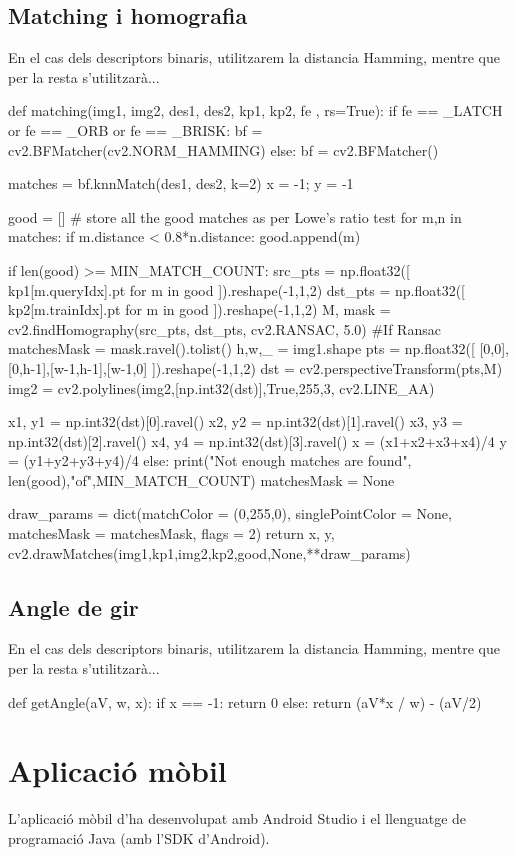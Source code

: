 	\subsection{Matching i homografia}
		En el cas dels descriptors binaris, utilitzarem la distancia Hamming, mentre que per la resta s'utilitzarà...\\
		\begin{python}
def matching(img1, img2, des1, des2, kp1, kp2, fe , rs=True):
	if fe == _LATCH or fe == _ORB or fe == _BRISK:
		bf = cv2.BFMatcher(cv2.NORM_HAMMING)
	else:
		bf = cv2.BFMatcher()

	matches = bf.knnMatch(des1, des2, k=2)
	x = -1; y = -1

	good = [] # store all the good matches as per Lowe's ratio test
	for m,n in matches:
		if m.distance < 0.8*n.distance:
			good.append(m)

	if len(good) >= MIN_MATCH_COUNT:
		src_pts = np.float32([ kp1[m.queryIdx].pt for m in good ]).reshape(-1,1,2)
		dst_pts = np.float32([ kp2[m.trainIdx].pt for m in good ]).reshape(-1,1,2)
		M, mask = cv2.findHomography(src_pts, dst_pts, cv2.RANSAC, 5.0) #If Ransac
		matchesMask = mask.ravel().tolist()
		h,w,_ = img1.shape
		pts = np.float32([ [0,0],[0,h-1],[w-1,h-1],[w-1,0] ]).reshape(-1,1,2)
		dst = cv2.perspectiveTransform(pts,M)
		img2 = cv2.polylines(img2,[np.int32(dst)],True,255,3, cv2.LINE_AA)

		x1, y1 = np.int32(dst)[0].ravel()
		x2, y2 = np.int32(dst)[1].ravel()
		x3, y3 = np.int32(dst)[2].ravel()
		x4, y4 = np.int32(dst)[3].ravel()
		x = (x1+x2+x3+x4)/4
		y = (y1+y2+y3+y4)/4
	else:
		print("Not enough matches are found", len(good),"of",MIN_MATCH_COUNT)
		matchesMask = None

	draw_params = dict(matchColor = (0,255,0), singlePointColor = None,
					matchesMask = matchesMask, flags = 2)
	return x, y, cv2.drawMatches(img1,kp1,img2,kp2,good,None,**draw_params)
		\end{python}
	\subsection{Angle de gir}
		En el cas dels descriptors binaris, utilitzarem la distancia Hamming, mentre que per la resta s'utilitzarà...\\
		\begin{python}
def getAngle(aV, w, x):
	if x == -1:
		return 0
	else:
		return (aV*x / w) - (aV/2)
		\end{python}

\section{Aplicació mòbil}
	L'aplicació mòbil d'ha desenvolupat amb Android Studio i el llenguatge de programació Java (amb l'SDK d'Android).
